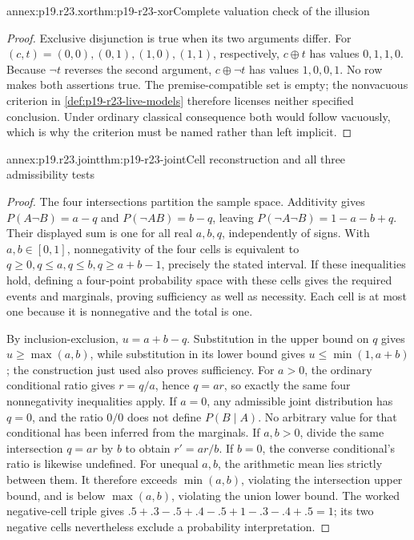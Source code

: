 \begin{annexitem}{annex:p19.r23.xor}{thm:p19-r23-xor}{Complete valuation check of the illusion}
\begin{proof}
Exclusive disjunction is true when its two arguments differ. For
\((c,t)=(0,0),(0,1),(1,0),(1,1)\), respectively,
\(c\mathbin{\oplus}t\) has values \(0,1,1,0\). Because
\(\neg t\) reverses the second argument,
\(c\mathbin{\oplus}\neg t\) has values \(1,0,0,1\).
No row makes both assertions true. The premise-compatible set is empty;
the nonvacuous criterion in \cref{def:p19-r23-live-models} therefore
licenses neither specified conclusion. Under ordinary classical
consequence both would follow vacuously, which is why the criterion
must be named rather than left implicit.
\end{proof}
\end{annexitem}

\begin{annexitem}{annex:p19.r23.joint}{thm:p19-r23-joint}{Cell reconstruction and all three admissibility tests}
\begin{proof}
The four intersections partition the sample space. Additivity gives
\(P(A\neg B)=a-q\) and \(P(\neg A B)=b-q\), leaving
\(P(\neg A\neg B)=1-a-b+q\). Their displayed sum is one
for all real \(a,b,q\), independently of signs. With \(a,b\in[0,1]\),
nonnegativity of the four cells is equivalent to
\(q\geq0,q\leq a,q\leq b,q\geq a+b-1\), precisely the
stated interval. If these inequalities hold, defining a four-point
probability space with these cells gives the required events and
marginals, proving sufficiency as well as necessity. Each cell is at most
one because it is nonnegative and the total is one.

By inclusion-exclusion, \(u=a+b-q\). Substitution in the upper bound
on \(q\) gives \(u\geq\max(a,b)\), while substitution in its
lower bound gives \(u\leq\min(1,a+b)\); the construction just used
also proves sufficiency. For \(a>0\), the ordinary conditional ratio
gives \(r=q/a\), hence \(q=ar\), so exactly the same four
nonnegativity inequalities apply. If \(a=0\), any admissible joint
distribution has \(q=0\), and the ratio \(0/0\) does not define
\(P(B\mid A)\). No arbitrary value for that conditional has been
inferred from the marginals. If \(a,b>0\), divide the same intersection
\(q=ar\) by \(b\) to obtain \(r'=ar/b\). If \(b=0\),
the converse conditional's ratio is likewise undefined. For unequal
\(a,b\), the arithmetic mean lies strictly between them. It therefore
exceeds \(\min(a,b)\), violating the intersection upper bound, and
is below \(\max(a,b)\), violating the union lower bound. The worked
negative-cell triple gives
\(.5+.3-.5+.4-.5+1-.3-.4+.5=1\); its two negative cells
nevertheless exclude a probability interpretation.
\end{proof}
\end{annexitem}

